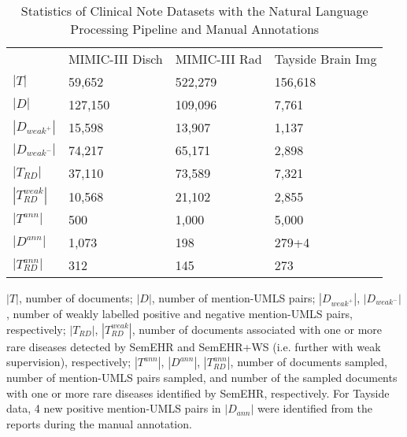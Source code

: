\documentclass[twocolumn]{bmcart}
\begin{document}
\begin{table}[ht]
	\caption{Statistics of Clinical Note Datasets with the Natural Language Processing Pipeline and Manual Annotations}
	\center
	\scriptsize
	\label{data-statistics}
	\begin{threeparttable}
		\begin{tabular}{llll}
			\cline{1-4}
			& MIMIC-III Disch       & MIMIC-III Rad      & Tayside Brain Img          \\
			\cline{1-4}
			$|T|$                   & 59,652              & 522,279           & 156,618           \\
			$|D|$                   & 127,150             & 109,096           & 7,761               \\
			$|D_{weak^+}|$           & 15,598              & 13,907            & 1,137             \\
			$|D_{weak^-}|$           & 74,217              & 65,171            & 2,898             \\
			$|T_{RD}|$     & 37,110              & 73,589            & 7,321                      \\
			$|T^{weak}_{RD}|$       & 10,568              & 21,102            & 2,855             \\
			\hline\hline
			$|T^{ann}|$             & 500                 & 1,000             & 5,000             \\
			$|D^{ann}|$             & 1,073               & 198               & 279+4             \\
			$|T^{ann}_{RD}|$        & 312                 & 145               & 273               \\
			\cline{1-4}
		\end{tabular}
		\begin{tablenotes}
			\item $|T|$, number of documents; $|D|$, number of mention-UMLS pairs; $|D_{weak^+}|$, $|D_{weak^-}|$, number of weakly labelled positive and negative mention-UMLS pairs, respectively; $|T_{RD}|$, $|T^{weak}_{RD}|$, number of documents associated with one or more rare diseases detected by SemEHR and SemEHR+WS (i.e. further with weak supervision), respectively; $|T^{ann}|$, $|D^{ann}|$, $|T^{ann}_{RD}|$, number of documents sampled, number of mention-UMLS pairs sampled, and number of the sampled documents with one or more rare diseases identified by SemEHR, respectively. For Tayside data, 4 new positive mention-UMLS pairs in $|D_{ann}|$ were identified from the reports during the manual annotation.
		\end{tablenotes}
	\end{threeparttable}
\end{table}
\end{document}
